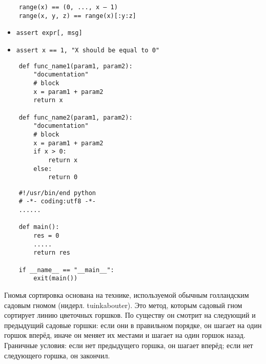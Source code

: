 \documentclass{article}
\begin{document}
\vspace{15pt}
\begin{lstlisting}
    range(x) == (0, ..., x – 1)
    range(x, y, z) == range(x)[:y:z]
\end{lstlisting}
\newpage

\begin{itemize}
    \item \lstinline!assert expr[, msg]!
    \item \lstinline!assert x == 1, "X should be equal to 0"!
\end{itemize}
\newpage

\begin{lstlisting}
    def func_name1(param1, param2):
        "documentation"
        # block
        x = param1 + param2
        return x

    def func_name2(param1, param2):
        "documentation"
        # block
        x = param1 + param2
        if x > 0:
            return x
        else:
            return 0
\end{lstlisting}
\newpage

\begin{lstlisting}
    #!/usr/bin/end python
    # -*- coding:utf8 -*-
    ......

    def main():
        res = 0
        .....
        return res

    if __name__ == "__main__":
        exit(main())
\end{lstlisting}
\newpage


\begin{itemize}
    Гномья сортировка основана на технике, используемой обычным голландским садовым гномом (нидерл. tuinkabouter). Это метод, которым садовый гном сортирует линию цветочных горшков. По существу он смотрит на следующий и предыдущий садовые горшки: если они в правильном порядке, он шагает на один горшок вперёд, иначе он меняет их местами и шагает на один горшок назад. Граничные условия: если нет предыдущего горшка, он шагает вперёд; если нет следующего горшка, он закончил.
\end{itemize}
\newpage 
\end{document}
